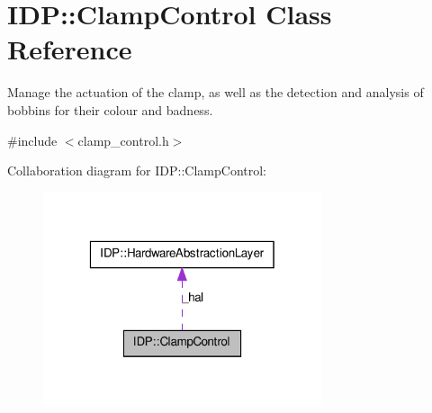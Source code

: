 \hypertarget{classIDP_1_1ClampControl}{
\section{IDP::ClampControl Class Reference}
\label{classIDP_1_1ClampControl}
}


Manage the actuation of the clamp, as well as the detection and analysis of bobbins for their colour and badness.  




{\ttfamily \#include $<$clamp\_\-control.h$>$}



Collaboration diagram for IDP::ClampControl:\nopagebreak
\begin{figure}[H]
\begin{center}
\leavevmode
\includegraphics[width=232pt]{classIDP_1_1ClampControl__coll__graph}
\end{center}
\end{figure}
